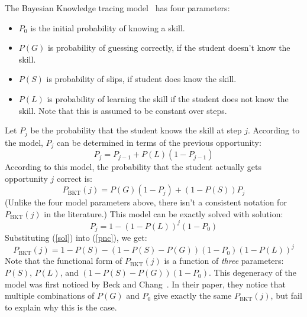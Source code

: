 \documentclass[11pt,letterpaper]{article}
\begin{document}
The Bayesian Knowledge tracing model~\cite{anderson} has four parameters:
%
\begin{itemize}
   \item $P_0$ is the initial probability of knowing a skill.
   \item $P(G)$ is probability of guessing correctly, if the student        
         doesn't know the skill.
   \item $P(S)$ is probability of slips, if student does know the skill.
   \item $P(L)$ is probability of learning the skill if the student 
         does not know the skill.  Note that this is assumed to 
         be constant over steps.
\end{itemize}
%
Let $P_j$ be the probability that the student knows the skill at 
step $j$. According to the model,  $P_j$ can
be determined in terms of the previous opportunity:
%
\begin{equation}
          P_j = P_{j-1} + P(L)\left(1-P_{j-1}\right)
\end{equation}
%
According to this model, the probability that the student actually gets
opportunity $j$ correct is:
%
\begin{equation}
        P_\mathrm{BKT}(j) = P(G)\left(1-P_j\right) + 
                     \left(1-P(S)\right) P_j \label{pnc}
\end{equation}
%
(Unlike the four model parameters above, there isn't a consistent
notation for $P_\mathrm{BKT}(j)$ in the literature.)
This model can be exactly solved with solution: 
%
\begin{equation}
            P_j = 1-\left(1-P(L)\right)^j\left(1-P_0\right)
	    \label{sol}
\end{equation}
%
%
Substituting (\ref{sol}) into (\ref{pnc}), we get:
%
\begin{equation}
         P_\mathrm{BKT}(j) = 1-P(S) -\left(1-P(S)-P(G)\right) \left(1-P_0\right)
                   \left(1-P(L)\right)^j \label{pncsoln}
\end{equation}
%
Note that the functional form of $P_\mathrm{BKT}(j)$ is a function of {\em three}
parameters:  $P(S)$, $P(L)$, and $\left(1-P(S)-P(G)\right) \left(1-P_0\right)$.
This degeneracy of the model was first noticed by Beck and 
Chang~\cite{beckchang}.  In their paper, they notice that multiple
combinations of $P(G)$ and $P_0$ give exactly the same $P_\mathrm{BKT}(j)$, but
fail to explain why this is the case.
\end{document}
